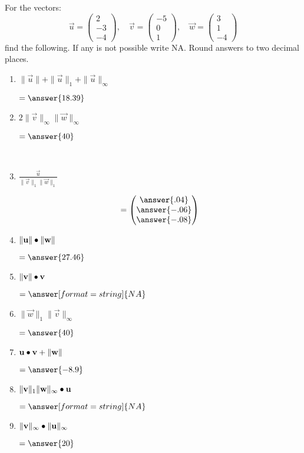 \documentclass{ximera}
\author{Parisa Fatheddin}
\begin{document}
\begin{exercise}
For the vectors:
\[\vec{u}= \begin{pmatrix}
2\\
-3\\
-4
\end{pmatrix}, \quad \vec{v} = \begin{pmatrix} -5\\ 0\\ 1 \end{pmatrix}, \quad 
\vec{w} = \begin{pmatrix} 3 \\ 1 \\ -4 \end{pmatrix}\]
find the following. If any is not possible write NA. Round answers to two decimal places.
\begin{enumerate}
\item $\|\vec{u}\| + \|\vec{u}\|_{1} + \|\vec{u}\|_{\infty}$
\begin{prompt}
$=\answer{18.39}$
\end{prompt}
\item $2 \|\vec{v}\|_{\infty} \|\vec{w}\|_{\infty}$
\begin{prompt}
$=\answer{40}$
\end{prompt}\\
\item $\frac{\vec{u}}{\|\vec{v}\|_{1} \|\vec{w}\|_{1}}$
\begin{prompt}
\[=\begin{pmatrix} \answer{.04} \\
\answer{-.06} \\
\answer{-.08}
\end{pmatrix}\]
\end{prompt}
\item $\|\mathbf{u}\| \bullet \|\mathbf{w}\|$
\begin{prompt}
$=\answer{27.46}$
\end{prompt} 
\item $\|\mathbf{v}\| \bullet \mathbf{v}$
\begin{prompt}
$=\answer[format=string]{NA}$
\end{prompt}
\item $\|\vec{w}\|_{1} \|\vec{v}\|_{\infty}$
\begin{prompt}
$=\answer{40}$
\end{prompt}
\item $\mathbf{u} \bullet \mathbf{v} + \|\mathbf{w}\|$
\begin{prompt}
$=\answer{-8.9}$
\end{prompt} 
\item $\|\mathbf{v}\|_{1} \|\mathbf{w}\|_{\infty} \bullet \mathbf{u}$
\begin{prompt}
$=\answer[format=string]{NA}$
\end{prompt}
\item $\|\mathbf{v}\|_{\infty} \bullet \|\mathbf{u}\|_{\infty}$
\begin{prompt}
$=\answer{20}$
\end{prompt}
\end{enumerate}
\end{exercise}
\end{document}
